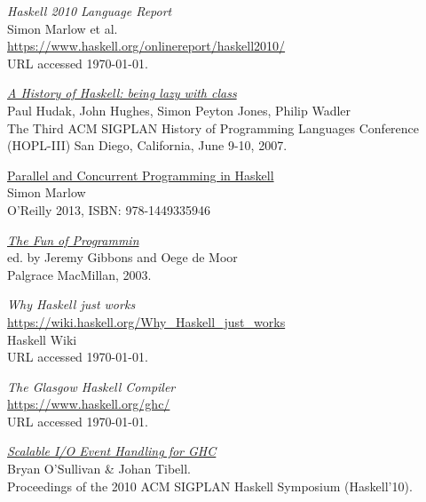 \documentclass[a4paper,11pt,oneside]{report}
\begin{document}
\begin{thebibliography}{9}

  \emph{Haskell 2010 Language Report}\\
  \newblock Simon Marlow et al.\\
  \newblock \url{https://www.haskell.org/onlinereport/haskell2010/}\\
  \newblock URL accessed \today.

  \href{http://research.microsoft.com/en-us/um/people/simonpj/papers/history-of-haskell/history.pdf}{\emph{A History of Haskell: being lazy with class}}\\
  \newblock Paul Hudak, John Hughes, Simon Peyton Jones, Philip Wadler\\
  \newblock The Third ACM SIGPLAN History of Programming Languages Conference
  (HOPL-III) San Diego, California, June 9-10, 2007.

  \href{http://community.haskell.org/~simonmar/pcph/}{Parallel and Concurrent
    Programming in Haskell}\\
  \newblock Simon Marlow\\
  \newblock O'Reilly 2013, ISBN: 978-1449335946

  \href{https://www.cs.ox.ac.uk/publications/books/fop/}{\emph{The Fun of Programmin}}\\
  \newblock ed. by Jeremy Gibbons and Oege de Moor\\
  \newblock Palgrace MacMillan, 2003.

 \emph{Why Haskell just works}\\
  \newblock \url{https://wiki.haskell.org/Why_Haskell_just_works}\\
  \newblock Haskell Wiki\\
  \newblock URL accessed \today.

  \emph{The Glasgow Haskell Compiler}\\
  \newblock \url{https://www.haskell.org/ghc/}\\
  \newblock URL accessed \today.

  \href{http://research.google.com/pubs/pub36841.html}{\emph{Scalable I/O Event Handling for GHC}}\\
  \newblock Bryan O'Sullivan \& Johan Tibell.\\
  \newblock Proceedings of the 2010 ACM SIGPLAN Haskell Symposium (Haskell'10).


\end{thebibliography}
\end{document}
